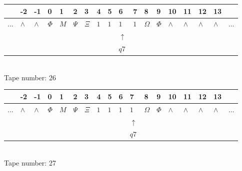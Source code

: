 \documentclass[11pt]{article}
\begin{document}
\begin{table}[H]
\centering
\begin{tabular}{llllllllllllllllll}
 & -2 & -1 & 0 & 1 & 2 & 3 & 4 & 5 & 6 & 7 & 8 & 9 & 10 & 11 & 12 & 13 & \\
\hline
$...$ & \multicolumn{1}{|l|}{$\wedge$} & \multicolumn{1}{|l|}{$\wedge$} & \multicolumn{1}{|l|}{$\Phi$} & \multicolumn{1}{|l|}{$M$} & \multicolumn{1}{|l|}{$\Psi$} & \multicolumn{1}{|l|}{$\Xi$} & \multicolumn{1}{|l|}{$1$} & \multicolumn{1}{|l|}{$1$} & \multicolumn{1}{|l|}{$1$} & \multicolumn{1}{|l|}{$1$} & \multicolumn{1}{|l|}{$\Omega$} & \multicolumn{1}{|l|}{$\Phi$} & \multicolumn{1}{|l|}{$\wedge$} & \multicolumn{1}{|l|}{$\wedge$} & \multicolumn{1}{|l|}{$\wedge$} & \multicolumn{1}{|l|}{$\wedge$} & $...$\\
\hline
&  &  &  &  &  &  &  &  & $\uparrow$ &  &  &  &  &  &  &  &  \\
&  &  &  &  &  &  &  &  & $ q7 $ &  &  &  &  &  &  &  &  \\
\end{tabular}
\\
Tape number: 26
\noindent\makebox[\linewidth]{\hdashrule{\textwidth}{1pt}{1pt}}\end{table}

\begin{table}[H]
\centering
\begin{tabular}{llllllllllllllllll}
 & -2 & -1 & 0 & 1 & 2 & 3 & 4 & 5 & 6 & 7 & 8 & 9 & 10 & 11 & 12 & 13 & \\
\hline
$...$ & \multicolumn{1}{|l|}{$\wedge$} & \multicolumn{1}{|l|}{$\wedge$} & \multicolumn{1}{|l|}{$\Phi$} & \multicolumn{1}{|l|}{$M$} & \multicolumn{1}{|l|}{$\Psi$} & \multicolumn{1}{|l|}{$\Xi$} & \multicolumn{1}{|l|}{$1$} & \multicolumn{1}{|l|}{$1$} & \multicolumn{1}{|l|}{$1$} & \multicolumn{1}{|l|}{$1$} & \multicolumn{1}{|l|}{$\Omega$} & \multicolumn{1}{|l|}{$\Phi$} & \multicolumn{1}{|l|}{$\wedge$} & \multicolumn{1}{|l|}{$\wedge$} & \multicolumn{1}{|l|}{$\wedge$} & \multicolumn{1}{|l|}{$\wedge$} & $...$\\
\hline
&  &  &  &  &  &  &  &  &  & $\uparrow$ &  &  &  &  &  &  &  \\
&  &  &  &  &  &  &  &  &  & $ q7 $ &  &  &  &  &  &  &  \\
\end{tabular}
\\
Tape number: 27
\noindent\makebox[\linewidth]{\hdashrule{\textwidth}{1pt}{1pt}}\end{table}
\end{document}
